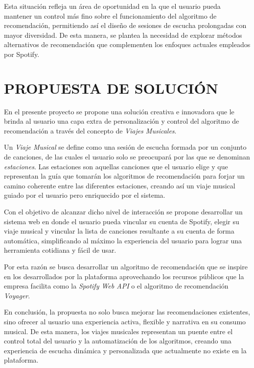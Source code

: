 Esta situación refleja un área de oportunidad en la que el usuario pueda mantener un control más fino sobre el funcionamiento del algoritmo de recomendación, permitiendo así el diseño de sesiones de escucha prolongadas con mayor diversidad. De esta manera, se plantea la necesidad de explorar métodos alternativos de recomendación que complementen los enfoques actuales empleados por Spotify.

\newpage
\thispagestyle{plain}
\vspace*{0.2cm}
\section{PROPUESTA DE SOLUCIÓN}

En el presente proyecto se propone una solución creativa e innovadora que le brinda al usuario una capa extra de personalización y control del algoritmo de recomendación a través del concepto de \textit{Viajes Musicales}.

Un \textit{Viaje Musical} se define como una sesión de escucha formada por un conjunto de canciones, de las cuales el usuario solo se preocupará por las que se denominan \textit{estaciones}. Las estaciones son aquellas canciones que el usuario elige y que representan la guía que tomarán los algoritmos de recomendación para forjar un camino coherente entre las diferentes estaciones, creando así un viaje musical guiado por el usuario pero enriquecido por el sistema.

Con el objetivo de alcanzar dicho nivel de interacción se propone desarrollar un sistema web en donde el usuario pueda vincular su cuenta de Spotify, elegir su viaje musical y vincular la lista de canciones resultante a su cuenta de forma automática, simplificando al máximo la experiencia del usuario para lograr una herramienta cotidiana y fácil de usar.

Por esta razón se busca desarrollar un algoritmo de recomendación que se inspire en los desarrollados por la plataforma aprovechando los recursos públicos que la empresa facilita como la \textit{Spotify Web API} o el algoritmo de recomendación \textit{Voyager}.

En conclusión, la propuesta no solo busca mejorar las recomendaciones existentes, sino ofrecer al usuario una experiencia activa, flexible y narrativa en su consumo musical. De esta manera, los viajes musicales representan un puente entre el control total del usuario y la automatización de los algoritmos, creando una experiencia de escucha dinámica y personalizada que actualmente no existe en la plataforma.

